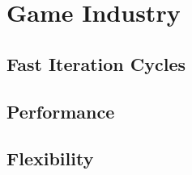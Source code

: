 \section{Game Industry}

\subsection{Fast Iteration Cycles}

\subsection{Performance}

\subsection{Flexibility}
